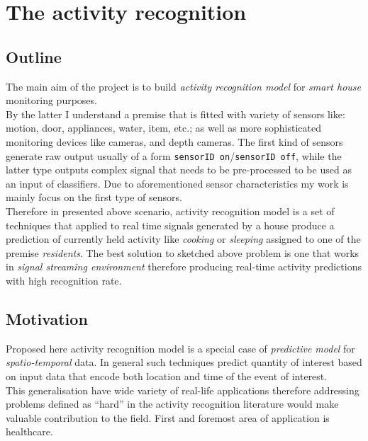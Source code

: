 \documentclass[12pt, a4paper, pdflatex, leqno, twoside, openright]{report}
\begin{document}
  \section{The activity recognition}
    \subsection{Outline} %
The main aim of the project is to build \emph{activity recognition model} for \emph{smart house} monitoring purposes.\\
By the latter I understand a premise that is fitted with variety of sensors like: motion, door, appliances, water, item, etc.; as well as more sophisticated monitoring devices like cameras, and depth cameras. The first kind of sensors generate raw output usually of a form \texttt{sensorID on}/\texttt{sensorID off}, while the latter type outputs complex signal that needs to be pre-processed to be used as an input of classifiers. Due to aforementioned sensor characteristics my work is mainly focus on the first type of sensors.\\
Therefore in presented above scenario, activity recognition model is a set of techniques that applied to real time signals generated by a house produce a prediction of currently held activity like \emph{cooking} or \emph{sleeping} assigned to one of the premise \emph{residents}. The best solution to sketched above problem is one that works in \emph{signal streaming environment} therefore producing real-time activity predictions with high recognition rate.

    \subsection{Motivation} %
Proposed here activity recognition model is a special case of \emph{predictive model} for \emph{spatio-temporal} data. In general such techniques predict quantity of interest based on input data that encode both location and time of the event of interest.\\
This generalisation have wide variety of real-life applications therefore addressing problems defined as ``hard'' in the activity recognition literature would make valuable contribution to the field. 
First and foremost area of application is healthcare.
\end{document}
